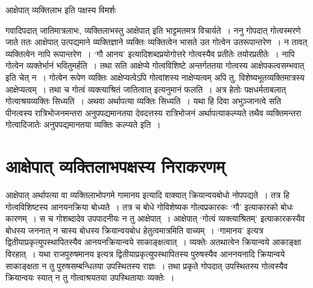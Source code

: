 {आक्षेपात् व्यक्तिलाभ इति पक्षस्य विमर्शः

गवादिपदात् जातिमात्रलाभः, व्यक्तिलाभस्तु आक्षेपात् इति भाट्टमतमत्र विचार्यते~। ननु गोपदात् गोत्वस्मरणे जाते ततः आक्षेपात् उत्पद्यमाने व्यक्तिज्ञाने व्यक्तिः व्यक्तित्वेन भासते उत गोत्वेन उतरूपान्तरेण~। न तावत् व्यक्तित्वेन नापि रूपान्तरेण~। ‘गौ आनय’ इत्यादिशब्दप्रयोगोत्तरे गोत्वस्यैव प्रतीतेः तयोरप्रतीतेः~। नापि गोत्वेन व्यक्तेर्भानं भवितुमर्हति~। तथा सति आक्षेप्ये गोत्वविशिष्टे अन्तर्गततया गोत्वस्य आक्षेपकत्वसम्भवात् इति चेत् न~। गोत्वेन रूपेण व्यक्तिः आक्षेप्यत्वेऽपि गोत्वांशस्य नाक्षेप्यत्वम् अपि तु, विशेष्यभूतव्यक्तिमात्रस्य आक्षेप्यत्वम्~। तथा च गोत्वं व्यक्त्याश्रितं जातित्वात् इत्यनुमानं फलति~। अत्र हेतोः पक्षधर्मताबलात् गोत्वाश्रयव्यक्तिः सिध्यति~। अथवा अर्थापत्या व्यक्तिः सिध्यति~। यथा हि दिवा अभुञ्जानत्वे सति पीनत्वस्य रात्रिभोजनमन्तरा अनुपपद्यमानतया देवदत्तस्य रात्रिभोजनं अर्थापत्या\break कल्प्यते तथैव व्यक्तिमन्तरा गोत्वादिजातेः अनुपपद्यमानतया व्यक्तिः कल्प्यते इति~। 

\section*{आक्षेपात् व्यक्तिलाभपक्षस्य निराकरणम्} 

आक्षेपात् अर्थापत्या वा व्यक्तिलाभोपगमे गामानय इत्यादि वाक्यात् क्रियान्वयबोधो नोप\-पद्यते~। तत्र हि गोत्वविशिष्टस्य आनयनक्रिया बोध्यते~। तत्र च बोधे गोविशेष्यक गोत्व\-प्रकारकः ‘गौ’ इत्याकारको बोधः कारणम्~। स च गोशब्दादेव उपपादनीयः न तु आक्षेपात्~। आक्षेपात् ‘गोत्वं व्यक्त्याश्रितम्’ इत्याकारकस्यैव बोधस्य जननात्  न चास्य बोधस्य क्रियान्वयबोध हेतुत्वमात्रमिति वाच्यम्~। ‘गामानय’ इत्यत्र द्वितीयाप्रकृत्युपस्थापितस्यैव आनयनक्रियान्वये साकाङ्क्षत्वात्~। व्यक्तेः अतथात्वेन क्रियान्वये आकाङ्क्षा विरहात्~। यथा राजपुरुषमानय इत्यत्र द्वितीयाप्रकृत्युपस्थापितस्य पुरुषस्यैव आननयनादि क्रियान्वये साकाङ्क्षता न तु पुरुषसम्बन्धितया उपस्थितस्य राज्ञः~। तथा प्रकृते गोपदात् उपस्थितस्य गोत्वस्यैव क्रियान्वयः स्यात् न तु गोत्वाश्रयतया उपस्थितायाः व्यक्तेः~। 

\articleend
}
